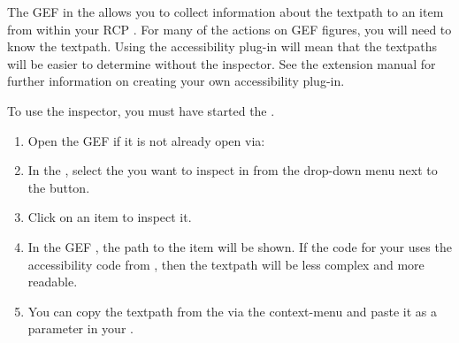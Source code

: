 
The GEF \gdinspector in the \ite{} allows you to collect information about the
textpath to an item from within your RCP \gdaut{}. For many of the actions on
GEF figures, you will need to know the textpath. Using the \app{} accessibility
plug-in will mean that the textpaths will be easier to determine without the
inspector. See the extension manual for further information on creating your own
accessibility plug-in.

To use the inspector, you must have started the \gdaut{} . 
\begin{enumerate}
\item Open the GEF \gdinspector{} if it is not already open via:\\
\item In the \gdinspector{}, select the \gdaut{} you want to inspect in from the drop-down menu next to the  button. 
\item Click on an item to inspect it.
\item In the GEF \gdinspector{}, the path to the item will be shown. If the code for your \gdaut{} uses the accessibility code from \app{}, then the textpath will be less complex and more readable. 
\item You can copy the textpath from the \gdinspector{} via the context-menu and paste it as a parameter in your \gdcases{}. 
\end{enumerate}
